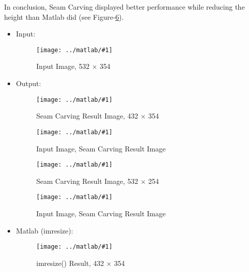 \documentclass{article}
\newcommand{\listFigure}[3]{ \begin{figure}[H]
\texttt{[image: ../matlab/\#1]}
		\caption{#2\label{fig:#3}}
	\end{figure}		
}
\begin{document}
\begin{enumerate}
\begin{enumerate}
		In conclusion, Seam Carving displayed better performance while reducing the
		height than Matlab did (see Figure-\ref{fig:outputNorthKoreaMatlab}).
		\begin{itemize}
			\item Input:
			\listFigure{NorthKorea/inputNorthKorea.jpg}{Input Image, 532 $\times$
			354}{inputNorthKorea}
			\item Output:
			\listFigure{NorthKorea/outputNorthKoreaW.png}{Seam Carving Result Image, 432
			$\times$ 354}{outputNorthKoreaW} 
			\listFigure{NorthKorea/outputIOW.png}{Input Image, Seam Carving
			Result Image}{outputNorthKoreaIOW}
			\listFigure{NorthKorea/outputNorthKoreaH.png}{Seam Carving Result Image, 532
			$\times$ 254}{outputNorthKoreaH} 
			\listFigure{NorthKorea/outputIOH.png}{Input Image, Seam Carving
			Result Image}{outputNorthKoreaIOH}
			\item Matlab (imresize):
			\listFigure{NorthKorea/outputNorthKoreaMatlab.png}{imresize() Result, 432
			$\times$ 354}{outputNorthKoreaMatlab}
		\end{itemize}
		

\end{enumerate}
\end{enumerate}
\end{document}
